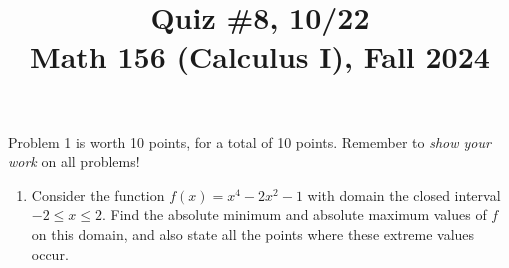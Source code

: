 \documentclass[11pt]{article}
\title{Quiz \#8, 10/22 \\ Math 156 (Calculus I), Fall 2024}
\date{}
\begin{document}
\maketitle

\thispagestyle{empty}

\vspace{-1cm}

Problem 1 is worth 10 points, for a total of 10 points. Remember to \emph{show your work} on all problems!

\begin{enumerate}
\item Consider the function $f(x) = x^4-2x^2-1$ with domain the closed interval $-2 \leq x \leq 2$. Find the absolute minimum and absolute maximum values of $f$ on this domain, and also state all the points where these extreme values occur.

\end{enumerate}
\end{document}
